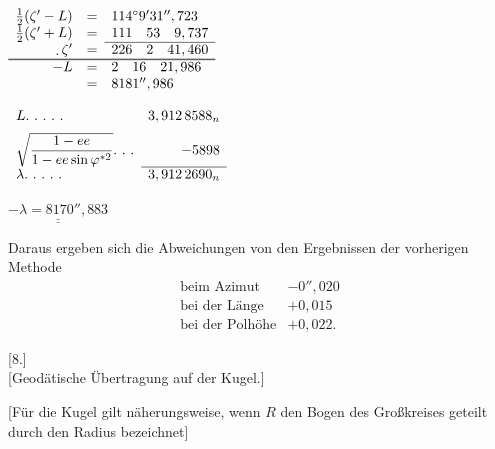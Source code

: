\begin{minipage}[t]{.33\linewidth}\vspace{0pt}\centering
\(\begin{array}{rcl}
\tfrac12(\zeta'-L)&=&114^\circ9'31'',723\\
\tfrac12(\zeta'+L)&=&111\quad53\quad9,737\\\cline{3-3}
\mathord{\raisebox{-.2ex}{.}}\,\zeta'&=&226\quad2\quad41,460\\\cline{1-3}\noalign{\vskip .45pt}\cline{1-3}
-L&=&2\quad16\quad21,986\\
&=&8181'',986
\end{array}\)
\par\smallskip
\(\begin{array}{lr}
L\ldotp\,\ldotp\,\ldotp\,\ldotp\,\ldotp&3,912\,8588_n\\[1.3ex]
\displaystyle\sqrt{\frac{1-ee}{1-ee\sin\varphi^{*2}}}\ldotp\,\ldotp\,\ldotp&-5898\\\cline{2-2}
\lambda\ldotp\,\ldotp\,\ldotp\,\ldotp\,\ldotp&3,912\,2690_n
\end{array}\)
\par\smallskip
\(\underline{\underline{-\lambda=8170'',883}}\)
\end{minipage}
\par\medskip
Daraus ergeben sich die Abweichungen von den Ergebnissen der vorherigen Methode
\[
\begin{array}{lr}
\text{beim Azimut}&-0'',020\\
\text{bei der Länge}&+0,015\\
\text{bei der Polhöhe}&+0,022.
\end{array}
\]
\endgroup
\begin{center}[8.]\\[.5ex][Geodätische Übertragung auf der Kugel.]\end{center}
[Für die Kugel gilt näherungsweise, wenn \(R\) den Bogen des Großkreises
geteilt durch den Radius bezeichnet]

